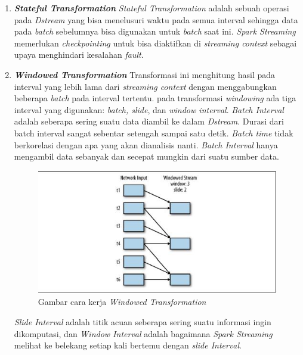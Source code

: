 \documentclass[a4paper,twoside]{article}
\begin{document}
\begin{enumerate}
	
		\item[]{\textbf{\textit{Stateful Transformation}}\newline
		\textit{Stateful Transformation} adalah sebuah operasi pada \textit{Dstream} yang bisa 					menelusuri waktu pada semua interval sehingga data pada \textit{batch} sebelumnya bisa 					digunakan untuk \textit{batch} saat ini.\newline
		\textit{Spark Streaming} memerlukan \textit{checkpointing} untuk bisa diaktifkan di 					\textit{streaming context} sebagai upaya menghindari kesalahan \textit{fault}. }
	
		\item[]{\textbf{\textit{Windowed Transformation}}\newline
		Transformasi ini menghitung hasil pada interval yang lebih lama dari \textit{streaming 					context} dengan menggabungkan beberapa \textit{batch} pada interval tertentu.
		pada transformasi \textit{windowing} ada tiga interval yang digunakan: \textit{batch, 					slide}, dan \textit{window interval}. \textit{Batch Interval} adalah seberapa sering 					suatu data diambil ke dalam \textit{Dstream}. Durasi dari batch interval sangat 						sebentar setengah sampai satu detik. \textit{Batch time} tidak berkorelasi dengan apa 					yang akan dianalisis nanti. \textit{Batch Interval} hanya mengambil data sebanyak dan 					secepat mungkin dari suatu sumber data. \newline
		
		\begin{figure}[H] 
		\centering  
		\includegraphics[scale=0.9]{windowing-streaming}  
		\caption[Gambar cara kerja \textit{Windowed Transformation}]{Gambar cara kerja 							\textit{Windowed Transformation}} 
		\label{fig:processing-events relationship} 
		\end{figure}
		}
		
		\textit{Slide Interval} adalah titik acuan seberapa sering suatu informasi ingin 						dikomputasi, dan \textit{Window Interval} adalah bagaimana \textit{Spark Streaming} 					melihat ke belekang setiap kali bertemu dengan \textit{slide Interval}.
		\newpage
		

\end{enumerate}
\end{document}

